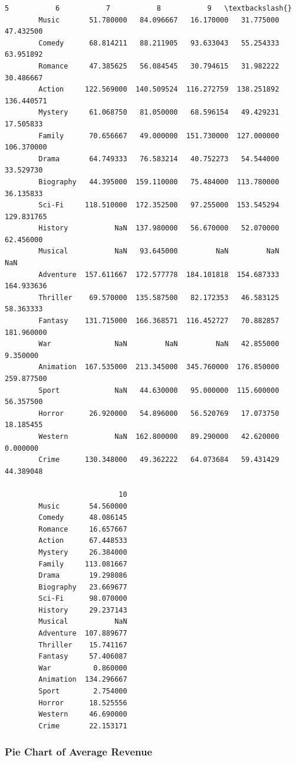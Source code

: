 \documentclass[11pt]{article}
\begin{document}
\begin{Verbatim}[commandchars=\\\{\}]
                           5           6           7           8           9   \textbackslash{}
        Music       51.780000   84.096667   16.170000   31.775000   47.432500   
        Comedy      68.814211   88.211905   93.633043   55.254333   63.951892   
        Romance     47.385625   56.084545   30.794615   31.982222   30.486667   
        Action     122.569000  140.509524  116.272759  138.251892  136.440571   
        Mystery     61.068750   81.050000   68.596154   49.429231   17.505833   
        Family      70.656667   49.000000  151.730000  127.000000  106.370000   
        Drama       64.749333   76.583214   40.752273   54.544000   33.529730   
        Biography   44.395000  159.110000   75.484000  113.780000   36.135833   
        Sci-Fi     118.510000  172.352500   97.255000  153.545294  129.831765   
        History           NaN  137.980000   56.670000   52.070000   62.456000   
        Musical           NaN   93.645000         NaN         NaN         NaN   
        Adventure  157.611667  172.577778  184.101818  154.687333  164.933636   
        Thriller    69.570000  135.587500   82.172353   46.583125   58.363333   
        Fantasy    131.715000  166.368571  116.452727   70.882857  181.960000   
        War               NaN         NaN         NaN   42.855000    9.350000   
        Animation  167.535000  213.345000  345.760000  176.850000  259.877500   
        Sport             NaN   44.630000   95.000000  115.600000   56.357500   
        Horror      26.920000   54.896000   56.520769   17.073750   18.185455   
        Western           NaN  162.800000   89.290000   42.620000    0.000000   
        Crime      130.348000   49.362222   64.073684   59.431429   44.389048   
        
                           10  
        Music       54.560000  
        Comedy      48.086145  
        Romance     16.657667  
        Action      67.448533  
        Mystery     26.384000  
        Family     113.081667  
        Drama       19.298086  
        Biography   23.669677  
        Sci-Fi      98.070000  
        History     29.237143  
        Musical           NaN  
        Adventure  107.889677  
        Thriller    15.741167  
        Fantasy     57.406087  
        War          0.860000  
        Animation  134.296667  
        Sport        2.754000  
        Horror      18.525556  
        Western     46.690000  
        Crime       22.153171  
\end{Verbatim}
            
    \subsubsection{Pie Chart of Average Revenue}\label{pie-chart-of-average-revenue}
\end{document}
